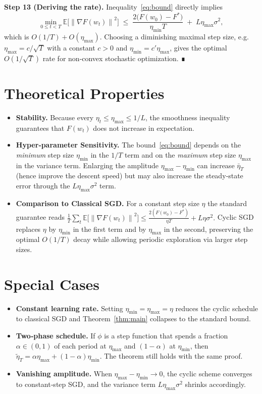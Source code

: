 \documentclass{article}
\newcommand{\E}{\mathbb{E}}
\newcommand{\norm}[1]{\left\|#1\right\|}
\begin{document}
\noindent\textbf{Step 13 (Deriving the rate).}  
Inequality~\eqref{eq:bound} directly implies
\[
\min_{0\le t<T}\E\!\big[\norm{\nabla F(w_{t})}^{2}\big]
\;\le\;
\frac{2\big(F(w_{0})-F^{*}\big)}{\eta_{\min}T}
\;+\;
L\eta_{\max}\sigma^{2},
\]
which is $O(1/T)+O(\eta_{\max})$.  Choosing a diminishing maximal step size,
e.g. $\eta_{\max}=c/\sqrt{T}$ with a constant $c>0$ and $\eta_{\min}=c'\eta_{\max}$,
gives the optimal $O(1/\sqrt{T})$ rate for non‑convex stochastic optimization. ∎

\section*{Theoretical Properties}
\begin{itemize}
\item \textbf{Stability.}  Because every $\eta_{t}\le\eta_{\max}\le 1/L$, the smoothness inequality guarantees that $F(w_{t})$ does not increase in expectation.
\item \textbf{Hyper‑parameter Sensitivity.}  The bound~\eqref{eq:bound} depends on the \emph{minimum} step size $\eta_{\min}$ in the $1/T$ term and on the \emph{maximum} step size $\eta_{\max}$ in the variance term.  Enlarging the amplitude $\eta_{\max}-\eta_{\min}$ can increase $\bar\eta_T$ (hence improve the descent speed) but may also increase the steady‑state error through the $L\eta_{\max}\sigma^{2}$ term.
\item \textbf{Comparison to Classical SGD.}  For a constant step size $\eta$ the standard guarantee reads 
\(
\frac{1}{T}\sum_{t}\E\!\big[\norm{\nabla F(w_{t})}^{2}\big]
\le \frac{2(F(w_{0})-F^{*})}{\eta T}+L\eta\sigma^{2}.
\)
Cyclic SGD replaces $\eta$ by $\eta_{\min}$ in the first term and by $\eta_{\max}$ in the second, preserving the optimal $O(1/T)$ decay while allowing periodic exploration via larger step sizes.
\end{itemize}

\section*{Special Cases}
\begin{itemize}
\item \textbf{Constant learning rate.}  Setting $\eta_{\min}=\eta_{\max}=\eta$ reduces the cyclic schedule to classical SGD and Theorem~\ref{thm:main} collapses to the standard bound.
\item \textbf{Two‑phase schedule.}  If $\phi$ is a step function that spends a fraction $\alpha\in(0,1)$ of each period at $\eta_{\max}$ and $(1-\alpha)$ at $\eta_{\min}$, then $\tilde\eta_T=\alpha\eta_{\max}+(1-\alpha)\eta_{\min}$.  The theorem still holds with the same proof.
\item \textbf{Vanishing amplitude.}  When $\eta_{\max}-\eta_{\min}\to0$, the cyclic scheme converges to constant‑step SGD, and the variance term $L\eta_{\max}\sigma^{2}$ shrinks accordingly.
\end{itemize}
\end{document}
